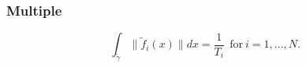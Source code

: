 \documentclass{article}
\theoremstyle{definition} \newtheorem{definition}{Definition}
\theoremstyle{remark} \newtheorem{remark}{Remark}
\newcommand{\boa}{\operatorname{BoA}}
\newcounter{ct}
\begin{document}

%
%
%


\subsubsection{Multiple}\label{sec:mlc_extras}
\begin{equation}\label{eq:nlc_constraints}
\int_{\tilde{\gamma}}\|\tilde{f}_i(x)\| dx = \frac{1}{T_i} \ \  \text{for} \ i=1,\dots, N. 	%
\end{equation}
\end{document}
